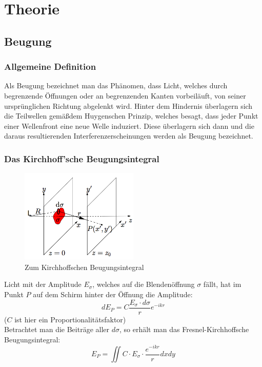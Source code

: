 \section{Theorie}


\subsection{Beugung}

\subsubsection{Allgemeine Definition}

Als Beugung bezeichnet man das Ph\"anomen, dass Licht, welches durch begrenzende \"Offnungen oder an begrenzenden Kanten vorbeil\"auft, von seiner urspr\"unglichen Richtung abgelenkt wird. Hinter dem Hindernis \"uberlagern sich die Teilwellen gem\"a\ss dem Huygenschen Prinzip, welches besagt, dass jeder Punkt einer Wellenfront eine neue Welle induziert. Diese \"uberlagern sich dann und die daraus resultierenden Interferenzerscheinungen werden als Beugung bezeichnet.

\subsubsection{Das Kirchhoff'sche Beugungsintegral}

\begin{figure}[H]
	\centering \includegraphics[width=0.5\textwidth]{Bilder/Beugungsintegral.jpg}
	\caption{Zum Kirchhoffschen Beugungsintegral}
\end{figure}

Licht mit der Amplitude $E_\sigma$, welches auf die Blenden\"offnung $\sigma$ f\"allt, hat im Punkt $P$ auf dem Schirm hinter der \"Offnung die Amplitude: $$dE_P = C\frac{E_\sigma \cdot d\sigma}{r}e^{-ikr}$$
($C$ ist hier ein Proportionalit\"atsfaktor)\\
Betrachtet man die Beitr\"age aller $d\sigma$, so erh\"alt man das Fresnel-Kirchhoffsche Beugungsintegral:
$$E_P=\iint C\cdot E_\sigma \cdot \frac{e^{-ikr}}{r}dxdy$$

